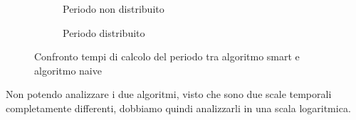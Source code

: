\documentclass[a4paper,titlepage]{article}
\begin{document}
\begin{figure}[h]
  \centering
  \begin{subfigure}{\textwidth}
    \captionsetup{justification=centering}
     \caption{Periodo non distribuito}
     \label{fig:smart_naive}
  \end{subfigure}%
  \vspace{2pt}
  \begin{subfigure}{\textwidth}
    \captionsetup{justification=centering}
     \caption{Periodo distribuito}
     \label{fig:smart_naive_dist}
  \end{subfigure}
  \caption{Confronto tempi di calcolo del periodo tra algoritmo smart e algoritmo naive}
\end{figure}

Non potendo analizzare i due algoritmi, visto che sono due scale temporali completamente differenti, dobbiamo quindi analizzarli in una scala logaritmica.
\newpage
\end{document}
